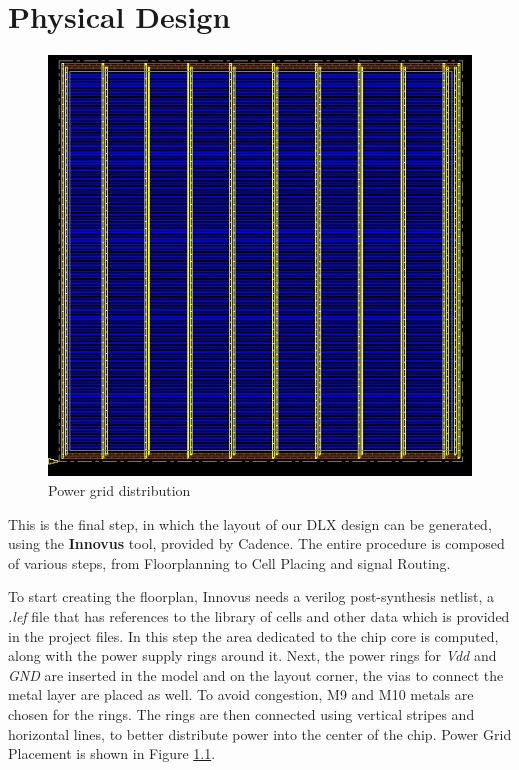 \chapter{Physical Design}
\label{physical_design}

	\begin{figure}[h!]
	\centering
	\includegraphics[width=\textwidth]{chapters/figures/4.horizontal_lines.jpg} 
	\caption{Power grid distribution}
	\label{fig:power_distribution}  %
	\end{figure}

This is the final step, in which the layout of our DLX design can be generated, using the \textbf{Innovus} tool, provided by Cadence.
The entire procedure is composed of various steps, from Floorplanning to Cell Placing and signal Routing.

To start creating the floorplan, Innovus needs a verilog post-synthesis netlist, a \textit{.lef} file that has references to the library of cells and other data which is
provided in the project files. In this step the area dedicated to the chip core is computed, along with the power supply rings around it.
Next, the power rings for \textit{Vdd} and \textit{GND} are inserted in the model and on the layout corner, the vias to connect the metal layer are placed as well. To avoid congestion, M9 and M10 metals are chosen for the rings.
The rings are then connected using vertical stripes and horizontal lines, to better distribute power into the center of the chip.
Power Grid Placement is shown in Figure \ref{fig:power_distribution}.

